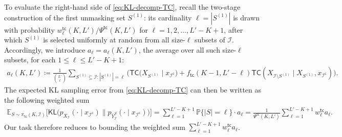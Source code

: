 \documentclass[english]{article}
\newcommand{\defn}{\coloneqq}
\newcommand{\cI}{\mathcal{I}}
\newcommand{\bE}{\mathbb{E}}
\newcommand{\bP}{\mathbb{P}}
\newcommand{\KL}{\mathsf{KL}}
\newcommand{\ol}{\overline}
\newcommand{\TC}{\mathsf{TC}}
\newcommand{\tc}{\mathsf{tc}}
\begin{document}
To evaluate the right-hand side of \eqref{eq:KL-decomp-TC}, recall the two-stage construction of the first unmasking set $S^{(1)}$: its cardinality $\ell = |S^{(1)}|$ is drawn with probability $w^\tc_{\ell}(K,L') / \Psi^\tc(K,L')$ for $\ell = 1, 2, \ldots, L'-K+1$, after which $S^{(1)}$ is selected uniformly at random from all size-$\ell$ subsets of $\cI$.
Accordingly, we introduce $a_\ell = a_\ell(K,L')$, the average over all such size-$\ell$ subsets, for each $1 \leq \ell \leq L'-K+1$:
\begin{align}
    a_\ell(K,L') \defn\frac{1}{\binom{L'}{\ell}}\sum_{S^{(1)} \subseteq \cI: |S^{(1)}|=\ell} \Big( \TC \big(X_{S^{(1)}}\mid x_{\cI^\mathsf{c}}\big) + f_\tc(K-1, L' - \ell)\TC(X_{\cI \setminus S^{(1)}} \mid X_{S^{(1)}}, x_{\cI^\mathsf{c}}) \Big). \label{eq:al-TC-def}
\end{align}
The expected KL sampling error from \eqref{eq:KL-decomp-TC} can then be written as the following weighted sum
\begin{align}\label{eq:KL-decomp-TC-2}
    \bE_{S \sim \pi_{\tc}(K, \cI)} \Big[\KL\big(p_{X_{\cI}}(\cdot \mid x_{\cI^\mathsf{c}}) \| p_{\ol Y_{\cI}^S}(\cdot \mid x_{\cI^\mathsf{c}}) \big)\Big] = \sum_{\ell = 1}^{L'-K+1} \bP\{|S|=\ell\} \cdot a_\ell = 
\frac{1}{\Psi^\tc(K,L')}\sum_{\ell = 1}^{L'-K+1} w^\tc_{\ell} a_\ell.
\end{align}
Our task therefore reduces to bounding the weighted sum $ \sum_{\ell=1}^{L'-K+1} w^\tc_{\ell} a_{\ell} $.
\end{document}
